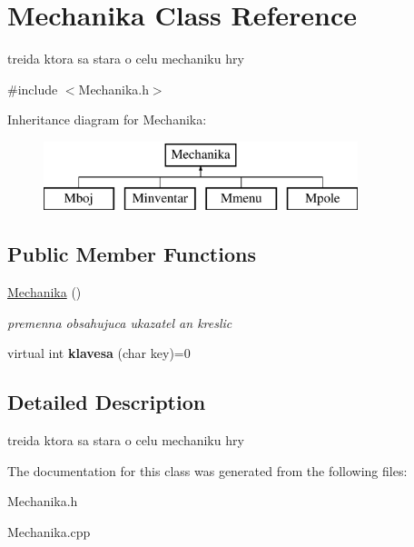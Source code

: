 \hypertarget{class_mechanika}{\section{Mechanika Class Reference}
\label{class_mechanika}
}


treida ktora sa stara o celu mechaniku hry  




{\ttfamily \#include $<$Mechanika.\-h$>$}

Inheritance diagram for Mechanika\-:\begin{figure}[H]
\begin{center}
\leavevmode
\includegraphics[height=2.000000cm]{class_mechanika}
\end{center}
\end{figure}
\subsection*{Public Member Functions}
\begin{DoxyCompactItemize}
\item 
\hypertarget{class_mechanika_ad7f0907c64f39a282c70d5349f0c7759}{\hyperlink{class_mechanika_ad7f0907c64f39a282c70d5349f0c7759}{Mechanika} ()}\label{class_mechanika_ad7f0907c64f39a282c70d5349f0c7759}

\begin{DoxyCompactList}\small\item\em premenna obsahujuca ukazatel an kreslic \end{DoxyCompactList}\item 
\hypertarget{class_mechanika_ac3f528e801774934865a993b4c9e3409}{virtual int {\bfseries klavesa} (char key)=0}\label{class_mechanika_ac3f528e801774934865a993b4c9e3409}

\end{DoxyCompactItemize}


\subsection{Detailed Description}
treida ktora sa stara o celu mechaniku hry 

The documentation for this class was generated from the following files\-:\begin{DoxyCompactItemize}
\item 
Mechanika.\-h\item 
Mechanika.\-cpp\end{DoxyCompactItemize}
